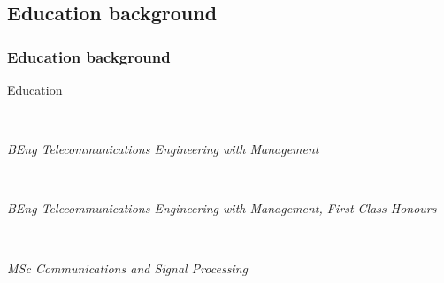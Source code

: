\subsection{Education background}
\begin{frame}
\frametitle{Education background}

\begin{block}{Education}

  \begin{minipage}[t]{0.77\textwidth}
  \end{minipage}
    ~
  \begin{minipage}[t]{0.2\textwidth}
  \end{minipage}

  {\small \textit{BEng Telecommunications Engineering with Management}} \\

  \begin{minipage}[t]{0.77\textwidth}
  \end{minipage}
    ~
  \begin{minipage}[t]{0.2\textwidth}
  \end{minipage}
  
  {\small \textit{BEng Telecommunications Engineering with Management, First Class Honours}} \\

  \begin{minipage}[t]{0.77\textwidth}
  \end{minipage}
    ~
  \begin{minipage}[t]{0.2\textwidth}
  \end{minipage}
  
  {\small \textit{MSc Communications and Signal Processing}} \\


\end{block}

\end{frame}